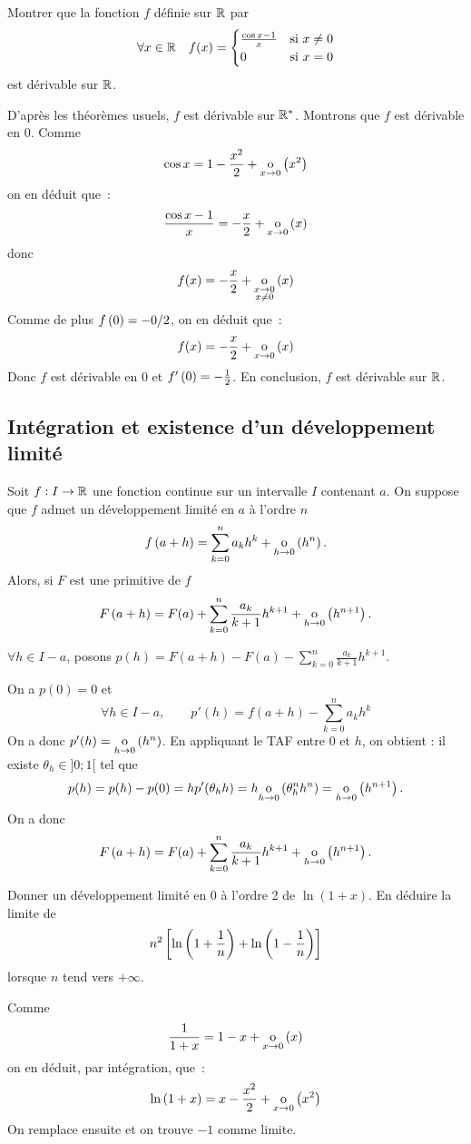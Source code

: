 \documentclass{magnolia}
\begin{document}
\begin{exoUnique}
\exo Montrer que la fonction $f$ définie sur $\mathbb{R}$ par
  \[\forall x\in\mathbb{R} \quad f(x)=
    \begin{cases}
    \frac{\cos x-1}{x} & \text{si $x\neq 0$}\\
    0 & \text{si $x=0$}
    \end{cases}\]
  est dérivable sur $\mathbb{R}$.
\begin{sol}
   D'après les théorèmes
   usuels, $f$ est dérivable sur ${\mathbb{R}^*}$. Montrons que $f$ est dérivable en 0.
   Comme
   \[\cos x=1-\frac{x^2}{2}+\underset{x \rightarrow 0}{\text{o}}\left(x^2\right)\]
   on en déduit que~:
   \[\frac{\cos x-1}{x}=-\frac{x}{2}+\underset{x \rightarrow 0}{\text{o}}\left(x\right)\]
   donc
   \[f(x)=-\frac{x}{2}+\underset{\substack{x \rightarrow 0\\x\neq 0}}{\text{o}} \left(x\right)\]
   Comme de plus $f\left(0\right)=-0/2$, on en déduit que~:
   \[f(x)=-\frac{x}{2}+\underset{x \rightarrow 0}{\text{o}}\left(x\right)\]
   Donc $f$ est dérivable en 0 et $f'\left(0\right)=-\frac{1}{2}$. En conclusion, $f$ est
   dérivable sur $\mathbb{R}$.
\end{sol}
\end{exoUnique}

\subsection{Intégration et existence d'un développement limité}

\begin{proposition}[utile=-3]
Soit $f:I\to\mathbb{R}$ une fonction continue sur un intervalle $I$ contenant $a$. On suppose que
$f$ admet un développement limité en $a$ à l'ordre $n$
\[f\left(a+h\right)=\sum_{k=0}^n a_k h^k+\underset{h \rightarrow 0}{\text{o}}\left(h^n\right).\]
Alors, si $F$ est une primitive de $f$~
\[F\left(a+h\right)=F(a)+\sum_{k=0}^n \frac{a_k}{k+1} h^{k+1}+
  \underset{h \rightarrow 0}{\text{o}}\left(h^{n+1}\right).\]
\end{proposition}

\begin{preuve}
$\forall h \in I-a$, posons $p(h)=F(a+h)-F(a)-\displaystyle \sum_{k=0}^n \frac{a_k}{k+1} h^{k+1}$.

On a $p(0)=0$ et \[\forall h \in I-a, \qquad p'(h)=f(a+h)-\sum_{k=0}^n a_k h^k\]
On a donc $p'(h)=\underset{h \rightarrow 0}{\text{o}}\left(h^n\right)$. En appliquant le TAF entre $0$ et $h$, on obtient : il existe $\theta_h \in ]0;1[$ tel que \[p(h)=p(h)-p(0)=hp'(\theta_h h)=h\underset{h \rightarrow 0}{\text{o}}\left(\theta_h^n h^n\right)=\underset{h \rightarrow 0}{\text{o}}\left(h^{n+1}\right).\]
On a donc 
\[F\left(a+h\right)=F(a)+\sum_{k=0}^n \frac{a_k}{k+1} h^{k+1}+
  \underset{h \rightarrow 0}{\text{o}}\left(h^{n+1}\right).\]
  \end{preuve}

\begin{exoUnique}
\exo Donner un développement limité en 0 à l'ordre 2 de $\ln(1+x)$. En
  déduire la limite de
  \[n^2\left[\ln\left(1+\frac{1}{n}\right)+\ln\left(1-\frac{1}{n}\right)\right]\]
  lorsque $n$ tend vers $+\infty$.
  \begin{sol}
  Comme
  \[\frac{1}{1+x}=1-x+\underset{x \rightarrow 0}{\text{o}}\left(x\right)\]
  on en déduit, par intégration, que~:
  \[\ln\left(1+x\right)=x-\frac{x^2}{2}+\underset{x \rightarrow 0}{\text{o}}\left(x^2\right)\]  
  On remplace ensuite et on trouve $-1$ comme limite.  
  \end{sol}
\end{exoUnique}
\end{document}
